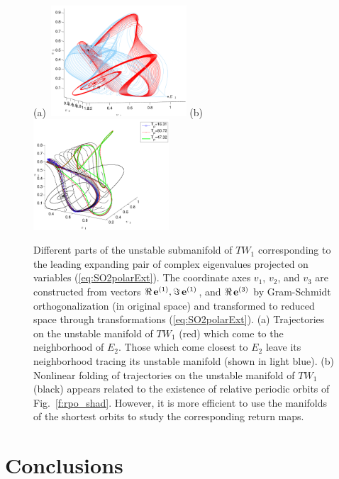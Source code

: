 \documentclass[aip,cha,showpacs,reprint]{revtex4-1} %
\newcommand{\refeq}  [1] {(\ref{#1})}
\newcommand{\reffig} [1] {Fig.~\ref{#1}}
\newcommand{\jEigvec}[1][]{\ensuremath{{\bf e}^{(#1)}}} %
\newcommand{\REQV}[2]{\ensuremath{TW_{#1#2}}} %
\newcommand{\EQV}[1]{\ensuremath{E_{#1}}}
\newcommand{\rpo}{rela\-ti\-ve periodic orbit}
\begin{document}
\begin{figure}[ht]
 \begin{center}
  (a)~\includegraphics[width=0.45\textwidth]{ks22_TW1_E2_manif_inv}
  (b)~\includegraphics[width=0.45\textwidth]{ks22_TW1_manif_rpos_inv}
 \end{center}
  \caption{Different parts of the unstable submanifold of \REQV{}{1} corresponding to the leading expanding pair of complex eigenvalues
projected on variables \refeq{eq:SO2polarExt}. The coordinate axes $v_1$,
$v_2$, and $v_3$ are constructed from vectors $\Re\, \jEigvec[1], \Im\, \jEigvec[1]$, and ${\Re\,} \jEigvec[3]$
by Gram-Schmidt orthogonalization (in original space) and transformed to reduced space through transformations
\refeq{eq:SO2polarExt}. (a) Trajectories on the unstable manifold of \REQV{}{1} (red) which come to the neighborhood of $\EQV{2}$.
Those which come closest to $\EQV{2}$ leave its neighborhood tracing its unstable manifold (shown in light blue).
(b) Nonlinear folding of trajectories on the unstable manifold of \REQV{}{1} (black) appears related to the existence of
\rpo s of \reffig{f:rpo_shad}. However, it is more efficient to use the manifolds of the shortest orbits to study the corresponding
return maps.
  }
\label{f:ks22_TW1_manifold}
\end{figure}





\section{Conclusions}
\end{document}
